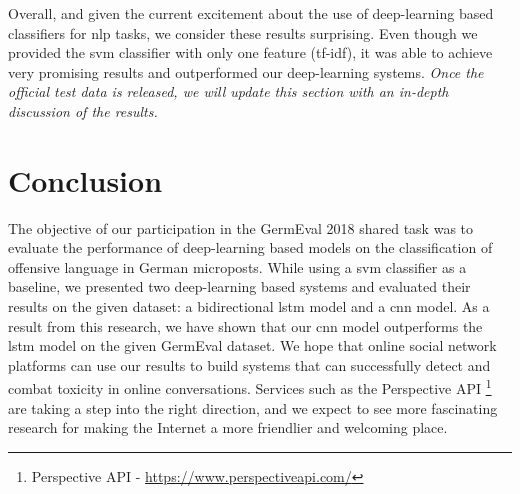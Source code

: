 \documentclass[11pt]{article}
\begin{document}
\newline
Overall, and given the current excitement about the use of deep-learning based classifiers for \ac{nlp} tasks, we consider these results surprising. Even though we provided the \ac{svm} classifier with only one feature (\ac{tf-idf}), it was able to achieve very promising results and outperformed our deep-learning systems. 
\newline
\textit{Once the official test data is released, we will update this section with an in-depth discussion of the results.}
\section{Conclusion}
The objective of our participation in the GermEval 2018 shared task was to evaluate the performance of deep-learning based models on the classification of offensive language in German microposts. While using a \ac{svm} classifier as a baseline, we presented two deep-learning based systems and evaluated their results on the given dataset: a bidirectional \ac{lstm} model and a \ac{cnn} model. As a result from this research, we have shown that our \ac{cnn} model outperforms the \ac{lstm} model on the given GermEval dataset. 
\newline
We hope that online social network platforms can use our results to build systems that can successfully detect and combat toxicity in online conversations. Services such as the Perspective API \footnote{Perspective API - \url{https://www.perspectiveapi.com/}} are taking a step into the right direction, and we expect to see more fascinating research for making the Internet a more friendlier and welcoming place.


\end{document}
